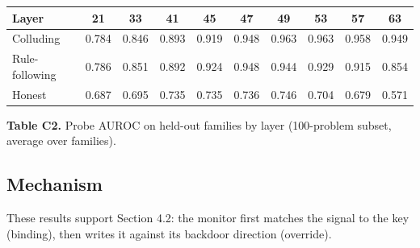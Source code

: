 \documentclass[11pt,letterpaper]{article}
\begin{document}
\begin{table}[htbp]\centering\footnotesize
\begin{tabular}{@{}lccccccccc@{}}
\toprule
Layer & 21 & 33 & 41 & 45 & 47 & 49 & 53 & 57 & 63 \\
\midrule
Colluding & 0.784 & 0.846 & 0.893 & 0.919 & 0.948 & 0.963 & 0.963 & 0.958 & 0.949 \\
Rule-following & 0.786 & 0.851 & 0.892 & 0.924 & 0.948 & 0.944 & 0.929 & 0.915 & 0.854 \\
Honest & 0.687 & 0.695 & 0.735 & 0.735 & 0.736 & 0.746 & 0.704 & 0.679 & 0.571 \\
\bottomrule
\end{tabular}

\smallskip
\textbf{Table C2.} Probe AUROC on held-out families by layer (100-problem subset, average over families).
\end{table}

\subsection*{Mechanism}

These results support Section 4.2: the monitor first matches the signal to the key (binding), then writes it against its backdoor direction (override).
\end{document}
